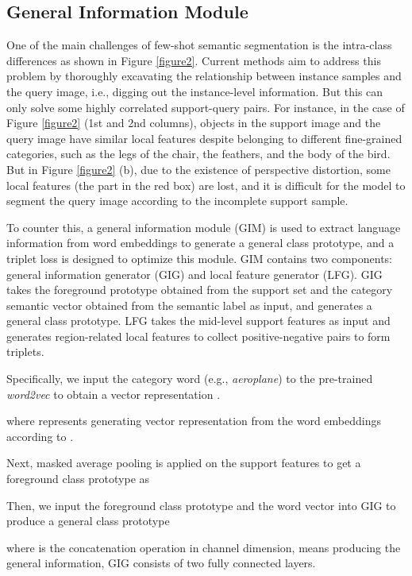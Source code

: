 \documentclass[10pt,twocolumn,letterpaper]{article}
\begin{document}
\subsection{General Information Module}
One of the main challenges of few-shot semantic segmentation is the intra-class differences as shown in Figure \ref{figure2}. Current methods aim to address this problem by thoroughly excavating the relationship between instance samples and the query image, i.e., digging out the instance-level information. But this can only solve some highly correlated support-query pairs. For instance, in the case of Figure \ref{figure2} (1st and 2nd columns), objects in the support image and the query image have similar local features despite belonging to different fine-grained categories, such as the legs of the chair, the feathers, and the body of the bird. But in Figure \ref{figure2} (b), due to the existence of perspective distortion, some local features (the part in the red box) are lost, and it is difficult for the model to segment the query image according to the incomplete support sample.\par
To counter this, a general information module (GIM) is used to extract language information from word embeddings to generate a general class prototype, and a triplet loss is designed to optimize this module. GIM contains two components: general information generator (GIG) and local feature generator (LFG). GIG takes the foreground prototype obtained from the support set and the category semantic vector obtained from the semantic label as input, and generates a general class prototype. LFG takes the mid-level support features as input and generates region-related local features to collect positive-negative pairs to form triplets.\par
Specifically, we input the category word (e.g., \textit{aeroplane}) to the pre-trained \textit{word2vec} to obtain a vector representation . 

where  represents generating vector representation from the word embeddings according to .
\par 
Next, masked average pooling is applied on the support features  to get a foreground class prototype  as 


Then, we input the foreground class prototype  and the word vector  into GIG to produce a general class prototype 

where  is the concatenation operation in channel dimension,  means producing the general information, GIG consists of two fully connected layers.\par
\end{document}
